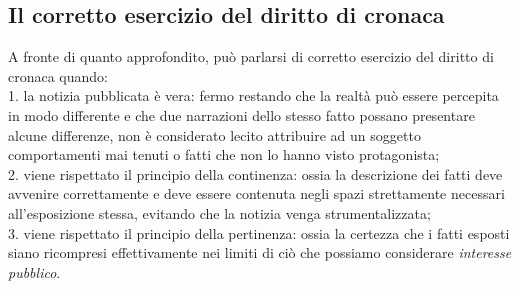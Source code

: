 \subsection{Il corretto esercizio del diritto di cronaca}
A fronte di quanto approfondito, può parlarsi di corretto esercizio del diritto di cronaca quando:
\\1. la notizia pubblicata è vera: fermo restando che la realtà può essere percepita in modo differente e che due narrazioni dello stesso fatto possano presentare alcune differenze, non è considerato lecito attribuire ad un soggetto comportamenti mai tenuti o fatti che non lo hanno visto protagonista;
\\2. viene rispettato il principio della continenza: ossia la descrizione dei fatti deve avvenire correttamente e deve essere contenuta negli spazi strettamente necessari all'esposizione stessa, evitando che la notizia venga strumentalizzata;
\\3. viene rispettato il principio della pertinenza: ossia la certezza che i fatti esposti siano ricompresi effettivamente nei limiti di ciò che possiamo considerare \textit{interesse pubblico}.

